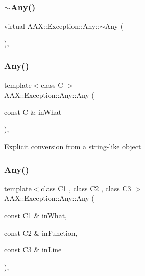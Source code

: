 \subsubsection{\texorpdfstring{$\sim$Any()}{~Any()}}
{\footnotesize\ttfamily virtual A\+A\+X\+::\+Exception\+::\+Any\+::$\sim$\+Any (\begin{DoxyParamCaption}{ }\end{DoxyParamCaption})\hspace{0.3cm}{\ttfamily [inline]}, {\ttfamily [virtual]}}

\mbox{\label{a01593_a35c51844258ed1c71259e98128fa1b49}} 
\subsubsection{\texorpdfstring{Any()}{Any()}\hspace{0.1cm}{\footnotesize\ttfamily [1/2]}}
{\footnotesize\ttfamily template$<$class C $>$ \\
A\+A\+X\+::\+Exception\+::\+Any\+::\+Any (\begin{DoxyParamCaption}\item[{const C \&}]{in\+What }\end{DoxyParamCaption})\hspace{0.3cm}{\ttfamily [inline]}, {\ttfamily [explicit]}}

Explicit conversion from a string-\/like object \mbox{\label{a01593_a9578bed0d27f81be2908f93f19034474}} 
\subsubsection{\texorpdfstring{Any()}{Any()}\hspace{0.1cm}{\footnotesize\ttfamily [2/2]}}
{\footnotesize\ttfamily template$<$class C1 , class C2 , class C3 $>$ \\
A\+A\+X\+::\+Exception\+::\+Any\+::\+Any (\begin{DoxyParamCaption}\item[{const C1 \&}]{in\+What,  }\item[{const C2 \&}]{in\+Function,  }\item[{const C3 \&}]{in\+Line }\end{DoxyParamCaption})\hspace{0.3cm}{\ttfamily [inline]}, {\ttfamily [explicit]}}

